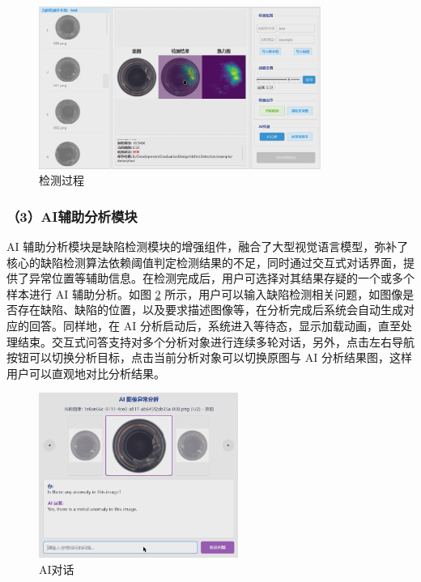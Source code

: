 \documentclass[
  ]{njuthesis}
\begin{document}
\begin{figure}[htb]
    \centering
    \includegraphics[width=0.82\textwidth]{images/检测过程.png}
    \caption{检测过程}
    \label{检测过程}
\end{figure}

\subsubsection{（3）AI辅助分析模块}

AI 辅助分析模块是缺陷检测模块的增强组件，融合了大型视觉语言模型，弥补了核心的缺陷检测算法依赖阈值判定检测结果的不足，同时通过交互式对话界面，提供了异常位置等辅助信息。在检测完成后，用户可选择对其结果存疑的一个或多个样本进行 AI 辅助分析。如图 \ref{AI对话} 所示，用户可以输入缺陷检测相关问题，如图像是否存在缺陷、缺陷的位置，以及要求描述图像等，在分析完成后系统会自动生成对应的回答。同样地，在 AI 分析启动后，系统进入等待态，显示加载动画，直至处理结束。交互式问答支持对多个分析对象进行连续多轮对话，另外，点击左右导航按钮可以切换分析目标，点击当前分析对象可以切换原图与 AI 分析结果图，这样用户可以直观地对比分析结果。

\begin{figure}[H]
    \centering
    \includegraphics[width=0.58\textwidth]{images/AI对话.png}
    \caption{AI对话}
    \label{AI对话}
\end{figure}
\end{document}
